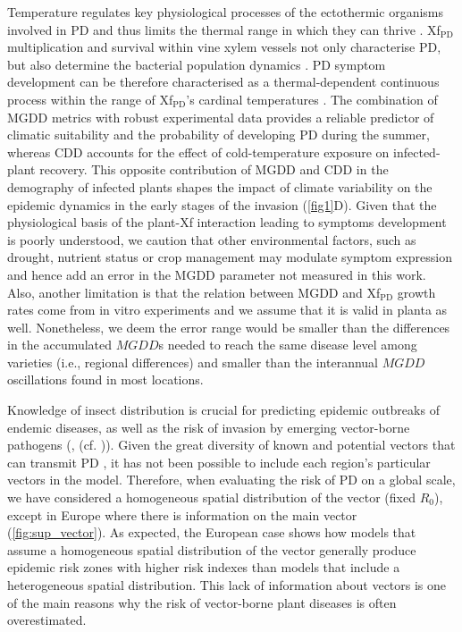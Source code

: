     Temperature regulates key physiological processes of the ectothermic
    organisms
    involved in PD and thus limits the thermal range in which they can thrive
    \cite{Coakley1999}. Xf$_{\textrm{PD}}$ multiplication and survival within
    vine
    xylem vessels not only characterise PD, but also determine the bacterial
    population dynamics \cite{fry1990multiplication,Feil2001}. PD symptom
    development can be therefore characterised as a thermal-dependent
    continuous
    process within the range of  Xf$_{\textrm{PD}}$'s cardinal temperatures
    \cite{Scherm1994}. The combination of MGDD metrics with robust experimental
    data provides a reliable predictor of climatic suitability and the
    probability
    of developing PD during the summer, whereas CDD accounts for the effect of
    cold-temperature exposure on infected-plant recovery. This opposite
    contribution of MGDD and CDD in the demography of infected plants shapes
    the
    impact of climate variability on the epidemic dynamics in the early stages
    of
    the invasion (\cref{fig1}D). Given that the physiological basis of the
    plant-Xf
    interaction leading to symptoms development is poorly understood, we
    caution
    that other environmental factors, such as drought, nutrient status or crop
    management may modulate symptom expression and hence add an error in the
    MGDD
    parameter not measured in this work. Also, another limitation is that the
    relation between MGDD and Xf$_{\textrm{PD}}$ growth rates come from in
    vitro
    experiments and we assume that it is valid in planta as well. Nonetheless,
    we
    deem the error range would be smaller than the differences in the
    accumulated
$MGDD$s needed to reach the same disease level among varieties (i.e., regional
    differences) and smaller than the interannual $MGDD$ oscillations found in
    most
    locations.

    Knowledge of insect distribution is crucial for predicting epidemic
    outbreaks
    of endemic diseases, as well as the risk of invasion by emerging
    vector-borne
    pathogens (\cite {Caminade2017,Jeger2019}, (cf. \cite{Schneider2020})).
    Given
    the great diversity of known and potential vectors that can transmit PD
    \cite{Redak2004}, it has not been possible to include each region's
    particular
    vectors in the model. Therefore, when evaluating the risk of PD on a global
    scale, we have considered a homogeneous spatial distribution of the vector
    (fixed $ R_0 $), except in Europe where there is information on the main
    vector
    (\cref{fig:sup_vector}). As expected, the European case shows how models
    that
    assume a homogeneous spatial distribution of the vector generally produce
    epidemic risk zones with higher risk indexes than models that include a
    heterogeneous spatial distribution.
    This
    lack of information about vectors is one of the main reasons why the risk
    of
    vector-borne plant diseases is often overestimated.

